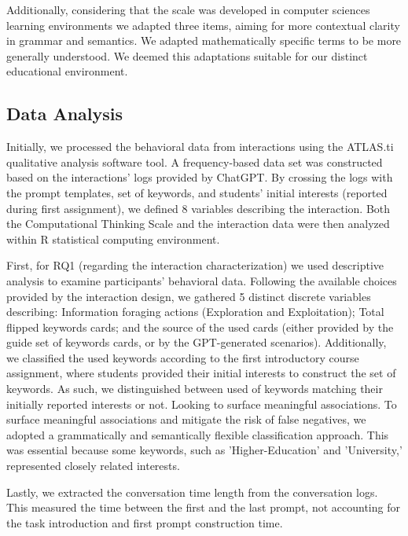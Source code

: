 \documentclass[sn-mathphys, Numbered]{sn-jnl}%
\theoremstyle{thmstyleone}%
\theoremstyle{thmstyletwo}%
\theoremstyle{thmstylethree}%
\begin{document}
Additionally, considering that the scale was developed in computer sciences learning environments we adapted three items, aiming for more contextual clarity in grammar and semantics. We adapted mathematically specific terms to be more generally understood. We deemed this adaptations suitable for our distinct educational environment.


\subsection*{Data Analysis}

Initially, we processed the behavioral data from interactions using the ATLAS.ti qualitative analysis software tool. A frequency-based data set was constructed based on the interactions' logs provided by ChatGPT. By crossing the logs with the prompt templates, set of keywords, and students' initial interests (reported during first assignment), we defined 8 variables describing the interaction. Both the Computational Thinking Scale and the interaction data were then analyzed within R statistical computing environment.

First, for RQ1 (regarding the interaction characterization) we used descriptive analysis to examine participants' behavioral data. Following the available choices provided by the interaction design, we gathered 5 distinct discrete variables describing: Information foraging actions (Exploration and Exploitation); Total flipped keywords cards; and the source of the used cards (either provided by the guide set of keywords cards, or by the GPT-generated scenarios). Additionally, we classified the used keywords according to the first introductory course assignment, where students provided their initial interests to construct the set of keywords. As such, we distinguished between used of keywords matching their initially reported interests or not. Looking to surface meaningful associations. To surface meaningful associations and mitigate the risk of false negatives, we adopted a grammatically and semantically flexible classification approach. This was essential because some keywords, such as 'Higher-Education' and 'University,' represented closely related interests. 

Lastly, we extracted the conversation time length from the conversation logs. This measured the time between the first and the last prompt, not accounting for the task introduction and first prompt construction time. 
\end{document}
